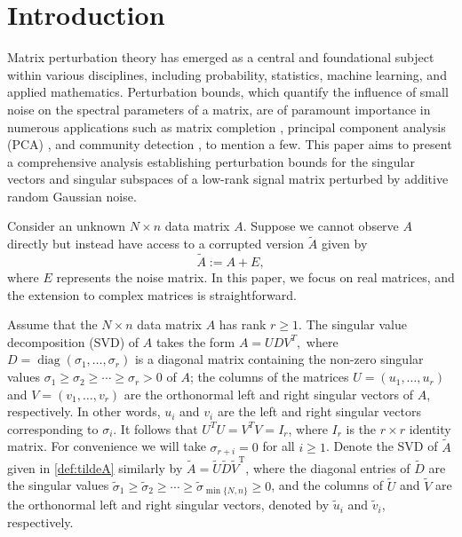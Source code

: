 \documentclass[reqno]{amsart}
\DeclareMathOperator{\diag}{diag}
\newcommand{\T}{\mathrm{T}}
\theoremstyle{plain}
\theoremstyle{definition}
\begin{document}
\section{Introduction}\label{sec:intro}
Matrix perturbation theory has emerged as a central and foundational subject within various disciplines, including probability, statistics, machine learning, and applied mathematics. Perturbation bounds, which quantify the influence of small noise on the spectral parameters of a matrix, are of paramount importance in numerous applications such as matrix completion \cite{MR2565240,Cands2010MatrixCW,KMO09}, principal component analysis (PCA) \cite{JL09}, and community detection \cite{VLBB08, Vu18}, to mention a few. This paper aims to present a comprehensive analysis establishing perturbation bounds for the singular vectors and singular subspaces of a low-rank signal matrix perturbed by additive random Gaussian noise.

Consider an unknown $N \times n$ data matrix $A$.  Suppose we cannot observe $A$ directly but instead have access to a corrupted version $\widetilde{A}$ given by
\begin{equation} \label{def:tildeA}
	\widetilde{A} := A + E, 
\end{equation} 
where $E$ represents the noise matrix.  In this paper, we focus on real matrices, and the extension to complex matrices is straightforward. 

Assume that the $N \times n$ data matrix $A$ has rank $r \geq 1$.  The singular value decomposition (SVD) of $A$ takes the form $A=U D V^T,$ where $D= \diag(\sigma_1,\ldots, \sigma_r)$ is a diagonal matrix containing the non-zero singular values $\sigma_1\ge \sigma_2 \ge \cdots \ge \sigma_r>0$ of $A$; the columns of the matrices $U=(u_1,\ldots,u_r)$ and $V=(v_1,\ldots,v_r)$ are the orthonormal left and right singular vectors of $A$, respectively.  In other words, $u_i$ and $v_i$ are the left and right singular vectors corresponding to $\sigma_i$.  It follows that $U^T U = V^T V = I_r$, where $I_r$ is the $r \times r$ identity matrix.  For convenience we will take $\sigma_{r+i} = 0$ for all $i \geq 1$.  
 Denote the SVD of $\widetilde A$ given in \eqref{def:tildeA} similarly by $\widetilde A = {\widetilde U} {\widetilde D} {\widetilde V}^\T$, where the diagonal entries of ${\widetilde D}$ are the singular values $\widetilde \sigma_1 \ge \widetilde \sigma_2 \ge \cdots \ge \widetilde \sigma_{\min\{N,n\}} \geq 0$, and the columns of $\widetilde U$ and $\widetilde V$ are the orthonormal left and right singular vectors, denoted by $\widetilde u_i$ and $\widetilde v_i$, respectively. 
\end{document}
